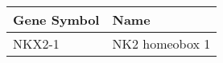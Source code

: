 \begin{tabular}{ll}
\toprule
Gene Symbol &           Name \\
\midrule
     NKX2-1 & NK2 homeobox 1 \\
\bottomrule
\end{tabular}
